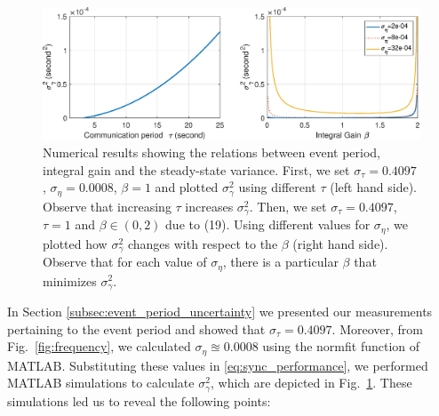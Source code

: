 \documentclass[10pt,journal,compsoc]{IEEEtran}
\begin{document}
\begin{figure}
	\centering
	\includegraphics[width=1.4\columnwidth]{figures/alpha-period-vs-variance.eps}
	\caption{\label{fig:simulations} Numerical results showing the relations between event period, integral gain and the steady-state variance. First, we set $\sigma_{\tau}=0.4097$, $\sigma_\eta = 0.0008$, $\beta=1$ and plotted $\sigma^2_{\gamma}$ using different $\tau$ (left hand side). Observe that increasing $\tau$ increases $\sigma^2_{\gamma}$. Then, we set $\sigma_{\tau}=0.4097$,	$\tau=1$ and $\beta \in (0,2)$ due to (19). Using different values for $\sigma_\eta$, we plotted how $\sigma^2_{\gamma}$ changes with respect to the $\beta$ (right hand side). Observe that for each value of $\sigma_\eta$, there is a particular $\beta$ that minimizes $\sigma^2_{\gamma}$.}
\end{figure}

In Section \ref{subsec:event_period_uncertainty} we presented our measurements pertaining to the event period and showed 
that $\sigma_{\tau}=0.4097$. Moreover, from Fig.~\ref{fig:frequency}, we calculated $\sigma_{\eta} \approxeq 0.0008$ using the \textsf{normfit} function of MATLAB.  Substituting these values in \eqref{eq:sync_performance}, we performed MATLAB simulations to calculate $\sigma^2_\gamma$, which are depicted in Fig.~\ref{fig:simulations}. These simulations led us to reveal the following points:
\end{document}
